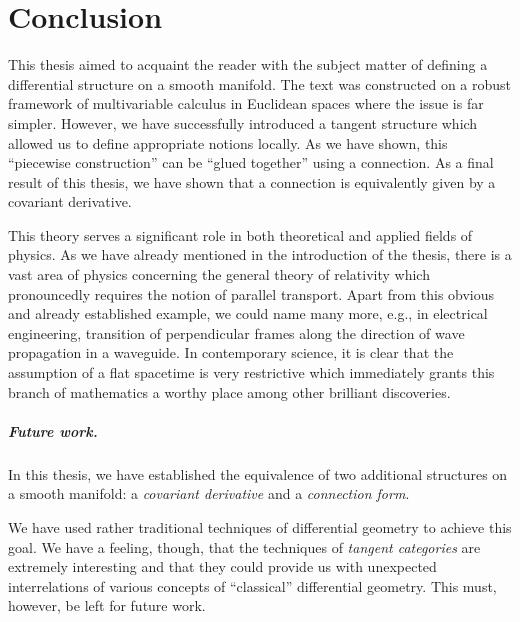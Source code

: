 \documentclass[11pt,a4paper,twoside,openany]{report}
\theoremstyle{my-theorem}
\theoremstyle{non-theorem}
\begin{document}
	
	\chapter*{Conclusion}
	\label{chap:conclusion}
	
		This thesis aimed to acquaint the reader with the subject matter of defining a differential structure on a smooth manifold. The text was constructed on a robust framework of multivariable calculus in Euclidean spaces where the issue is far simpler. However, we have successfully introduced a tangent structure which allowed us to define appropriate notions locally. As we have shown, this ``piecewise construction'' can be ``glued together'' using a connection. As a final result of this thesis, we have shown that a connection is equivalently given by a covariant derivative.
		
		This theory serves a significant role in both theoretical and applied fields of physics. As we have already mentioned in the introduction of the thesis, there is a vast area of physics concerning the general theory of relativity which pronouncedly requires the notion of parallel transport. Apart from this obvious and already established example, we could name many more, e.g., in electrical engineering, transition of perpendicular frames along the direction of wave propagation in a waveguide. In contemporary science, it is clear that the assumption of a flat spacetime is very restrictive which immediately grants this branch of mathematics a worthy place among other brilliant discoveries.
		
		\paragraph*{Future work.} In this thesis, we have established the equivalence of two additional structures on a smooth manifold: a \emph{covariant derivative} and a \emph{connection form}.
		
		We have used rather traditional techniques of differential geometry to achieve this goal. We have a feeling, though, that the techniques of \emph{tangent categories} are extremely interesting and that they could provide us with unexpected interrelations of various concepts of ``classical'' differential geometry. This must, however, be left for future work.
			
			
			
	
\end{document}
